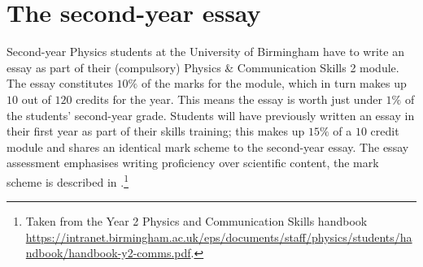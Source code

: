 \section{The second-year essay}{\label{sec:problem}

Second-year Physics students at the University of Birmingham have to write an essay as part of their (compulsory) Physics \& Communication Skills 2 module. The essay constitutes $10\%$ of the marks for the module, which in turn makes up $10$ out of $120$ credits for the year. This means the essay is worth just under $1\%$ of the students' second-year grade. Students will have previously written an essay in their first year as part of their skills training; this makes up $15\%$ of a $10$ credit module and shares an identical mark scheme to the second-year essay. The essay assessment emphasises writing proficiency over scientific content, the mark scheme is described in .\footnote{Taken from the Year 2 Physics and Communication Skills handbook \url{https://intranet.birmingham.ac.uk/eps/documents/staff/physics/students/handbook/handbook-y2-comms.pdf}.}

}

